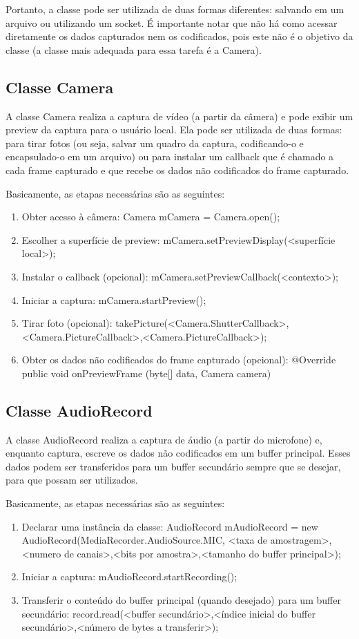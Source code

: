 \documentclass{acm_proc_article-sp}
\begin{document}
Portanto, a classe pode ser utilizada de duas formas diferentes: salvando em um arquivo ou utilizando um socket. É importante notar que não há como acessar diretamente os dados capturados nem os codificados, pois este não é o objetivo da classe (a classe mais adequada para essa tarefa é a Camera).

\subsection{Classe Camera}
A classe Camera realiza a captura de vídeo (a partir da câmera) e pode exibir um preview da captura para o usuário local. Ela pode ser utilizada de duas formas: para tirar fotos (ou seja, salvar um quadro da captura, codificando-o e encapsulado-o em um arquivo) ou para instalar um callback que é chamado a cada frame capturado e que recebe os dados não codificados do frame capturado.

Basicamente, as etapas necessárias são as seguintes:
\begin{enumerate}
 \item Obter acesso à câmera:
Camera mCamera = Camera.open();
 \item Escolher a superfície de preview:
mCamera.setPreviewDisplay(<superfície local>);
 \item Instalar o callback (opcional):
mCamera.setPreviewCallback(<contexto>);
 \item Iniciar a captura:
mCamera.startPreview();
 \item Tirar foto (opcional):
takePicture(<Camera.ShutterCallback>,<Camera.PictureCallback>,<Camera.PictureCallback>);
 \item Obter os dados não codificados do frame capturado (opcional):
@Override public void onPreviewFrame (byte[] data, Camera camera){}
\end{enumerate}

\subsection{Classe AudioRecord}
A classe AudioRecord realiza a captura de áudio (a partir do microfone) e, enquanto captura, escreve os dados não codificados em um buffer principal. Esses dados podem ser transferidos para um buffer secundário sempre que se desejar, para que possam ser utilizados.

Basicamente, as etapas necessárias são as seguintes:
\begin{enumerate}
 \item Declarar uma instância da classe:
AudioRecord mAudioRecord = new AudioRecord(MediaRecorder.AudioSource.MIC, <taxa de amostragem>,<numero de canais>,<bits por amostra>,<tamanho do buffer principal>);
 \item Iniciar a captura:
mAudioRecord.startRecording();
 \item Transferir o conteúdo do buffer principal (quando desejado) para um buffer secundário:
record.read(<buffer secundário>,<índice inicial do buffer secundário>,<número de bytes a transferir>);
\end{enumerate}
\end{document}
